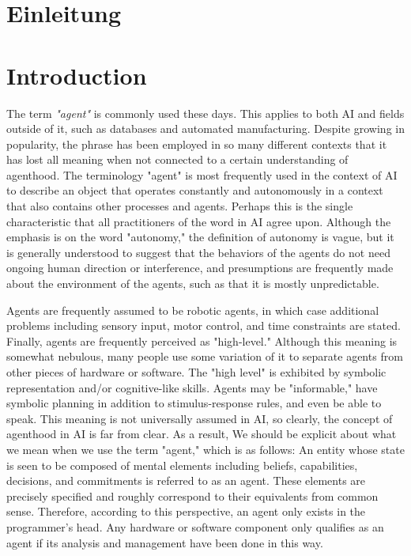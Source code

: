 {\chapter{Einleitung}}
{\chapter{Introduction}}

\label{sec:introduction}


The term \textit{"agent"} is commonly used these days. This applies to both \ac{AI} and fields outside of it, such as databases and automated manufacturing. Despite growing in popularity, the phrase has been employed in so many different contexts that it has lost all meaning when not connected to a certain understanding of agenthood. The terminology "agent" is most frequently used in the context of  \ac{AI} to describe an object that operates constantly and autonomously in a context that also contains other processes and agents. Perhaps this is the single characteristic that all practitioners of the word in \ac{AI} agree upon. Although the emphasis is on the word "autonomy,"  the definition of autonomy is vague, but it is generally understood to suggest that the behaviors of the agents do not need ongoing human direction or interference, and presumptions are frequently made about the environment of the agents, such as that it is mostly unpredictable.

\vspace{.5cm}

Agents are frequently assumed to be robotic agents, in which case additional problems including sensory input, motor control, and time constraints are stated. Finally, agents are frequently perceived as "high-level." Although this meaning is somewhat nebulous, many people use some variation of it to separate agents from other pieces of hardware or software. The "high level" is exhibited by symbolic representation and/or cognitive-like skills. Agents may be "informable," have symbolic planning in addition to stimulus-response rules, and even be able to speak. This meaning is not universally assumed in \ac{AI}, so clearly, the concept of agenthood in \ac{AI} is far from clear. As a result, We should be explicit about what we mean when we use the term "agent," which is as follows: An entity whose state is seen to be composed of mental elements including beliefs, capabilities, decisions, and commitments is referred to as an agent. These elements are precisely specified and roughly correspond to their equivalents from common sense. Therefore, according to this perspective, an agent only exists in the programmer's head. Any hardware or software component only qualifies as an agent if its analysis and management have been done in this way.

